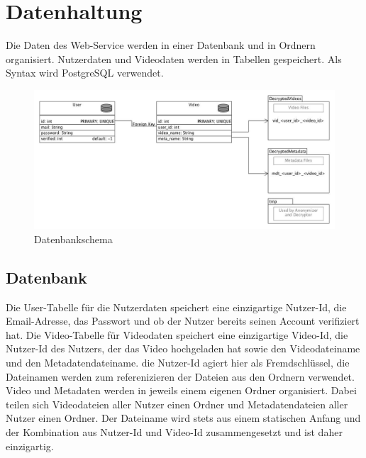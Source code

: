 \section{Datenhaltung}
Die Daten des Web-Service werden in einer Datenbank und in Ordnern organisiert. 
Nutzerdaten und Videodaten werden in Tabellen gespeichert. Als Syntax wird PostgreSQL verwendet. 

\begin{figure}[ht]
	\centering
\includegraphics[width=1\textwidth]{./resources/Diagramme/Webservice/database_scheme.jpg}
\caption{Datenbankschema}
	\label{fig:overview_mvp}
\end{figure}

\subsection{Datenbank}

Die User-Tabelle für die Nutzerdaten speichert eine einzigartige Nutzer-Id, die Email-Adresse, das Passwort und ob der Nutzer bereits seinen Account verifiziert hat.\newline
Die Video-Tabelle für Videodaten speichert eine einzigartige  Video-Id, die Nutzer-Id des Nutzers, der das Video hochgeladen hat sowie den Videodateiname und den Metadatendateiname. die Nutzer-Id agiert hier als Fremdschlüssel, die Dateinamen werden zum referenizieren der Dateien aus den Ordnern verwendet.\newline
Video und Metadaten werden in jeweils einem eigenen Ordner organisiert. Dabei teilen sich Videodateien aller Nutzer einen Ordner und Metadatendateien aller Nutzer einen Ordner. Der Dateiname wird stets aus einem statischen Anfang und der Kombination aus Nutzer-Id und Video-Id zusammengesetzt und ist daher einzigartig.

